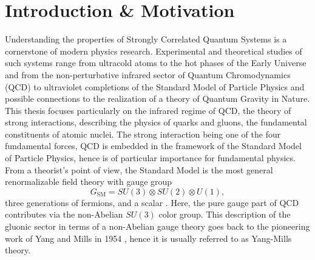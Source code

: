 \chapter{Introduction \& Motivation}\label{chap:motivation}
Understanding the properties of Strongly Correlated Quantum Systems is a cornerstone of modern physics research. Experimental and theoretical studies of such systems range from ultracold atoms to the hot phases of the Early Universe and from the non-perturbative infrared sector of Quantum Chromodynamics (QCD) to  ultraviolet completions of the Standard Model of Particle Physics and possible connections to the realization of a theory of Quantum Gravity in Nature.\\
This thesis focuses particularly on the infrared regime of QCD, the theory of strong interactions, describing the physics of quarks and gluons, the fundamental constituents of atomic nuclei. The strong interaction being  one of the four fundamental forces, QCD is embedded in the framework of the Standard Model of Particle Physics, hence is of particular importance for fundamental physics. From a theorist's point of view, the Standard Model is the most general renormalizable field theory with gauge group 
\begin{equation}
	G_{\text{SM}} = SU(3)\otimes SU(2) \otimes U(1),
\end{equation}
three generations of fermions, and a scalar \cite{Hebecker2020}. Here, the pure gauge part of QCD contributes via the non-Abelian $SU(3)$ color group. This description of the gluonic sector in terms of a non-Abelian gauge theory goes back to the pioneering work of Yang and Mills in 1954 \cite{YangMills1954}, hence it is usually referred to as Yang-Mills theory.     \\
